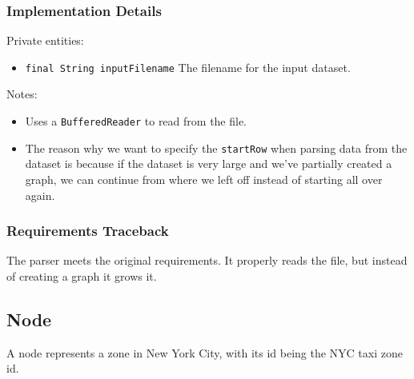 \documentclass[12pt]{article}
\newcommand{\bi}{\begin{itemize}}
\newcommand{\ei}{\end{itemize}}
\newcommand{\code}[1]{\texttt{#1}}
\begin{document}
\subsubsection{Implementation Details}

Private entities:
\bi
	\item \code{final String inputFilename} The filename for the input dataset.
\ei

\noindent Notes:
\bi
	\item Uses a \code{BufferedReader} to read from the file.
	\item The reason why we want to specify the \code{startRow} when parsing data from the dataset is because if the dataset is very large and we've
	partially created a graph, we can continue from where we left off instead
	of starting all over again. 
\ei

\subsubsection{Requirements Traceback}

The parser meets the original requirements. It properly reads the file, but instead of creating a graph it grows it. 

\newpage

\subsection{Node}

A node represents a zone in New York City, with its id being the NYC taxi zone id. 
\end{document}
